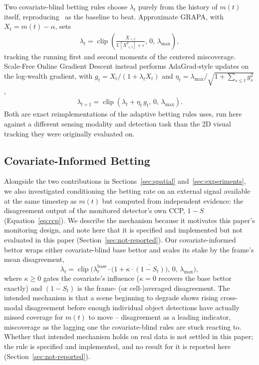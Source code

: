 Two covariate-blind betting rules choose $\lambda_t$ purely from the history of $m(t)$ itself, reproducing~\cite{MonroyMunoz2026WACV} as the baseline to beat. Approximate GRAPA, with $X_t = m(t) - \alpha$, sets
\begin{align*}
\lambda_t = \operatorname{clip}\!\left(\frac{\overline{X}_{<t}}{\mathbb{E}[X_{<t}^2] + \varepsilon}, \, 0, \, \lambda_{\max}\right),
\end{align*}
tracking the running first and second moments of the centered miscoverage. Scale-Free Online Gradient Descent instead performs AdaGrad-style updates on the log-wealth gradient, with $g_t = X_t / (1 + \lambda_t X_t)$ and $\eta_t = \lambda_{\max} / \sqrt{1 + \sum_{s \le t} g_s^2}$,
\begin{align*}
\lambda_{t+1} = \operatorname{clip}\!\left(\lambda_t + \eta_t \, g_t, \, 0, \, \lambda_{\max}\right).
\end{align*}
Both are exact reimplementations of the adaptive betting rules \cite{MonroyMunoz2026WACV} uses, run here against a different sensing modality and detection task than the 2D visual tracking they were originally evaluated on.

\subsection{Covariate-Informed Betting}
\label{sec:informed}

Alongside the two contributions in Sections~\ref{sec:spatial} and~\ref{sec:experiments}, we also investigated conditioning the betting rate on an external signal available at the same timestep as $m(t)$ but computed from independent evidence: the disagreement output of the monitored detector's own CCP, $1-S$ (Equation~\ref{eq:ccp}). We describe the mechanism because it motivates this paper's monitoring design, and note here that it is specified and implemented but not evaluated in this paper (Section~\ref{sec:not-reported}). Our covariate-informed bettor wraps either covariate-blind base bettor and scales its stake by the frame's mean disagreement,
\[
\lambda_t = \operatorname{clip}\!\Big(\lambda_t^{\text{base}} \cdot \big(1 + \kappa \cdot \overline{(1 - S_t)}\big), \, 0, \, \lambda_{\max}\Big),
\]
where $\kappa \ge 0$ gates the covariate's influence ($\kappa = 0$ recovers the base bettor exactly) and $\overline{(1-S_t)}$ is the frame- (or cell-)averaged disagreement. The intended mechanism is that a scene beginning to degrade shows rising cross-modal disagreement before enough individual object detections have actually missed coverage for $m(t)$ to move -- disagreement as a leading indicator, miscoverage as the lagging one the covariate-blind rules are stuck reacting to. Whether that intended mechanism holds on real data is not settled in this paper; the rule is specified and implemented, and no result for it is reported here (Section~\ref{sec:not-reported}).

